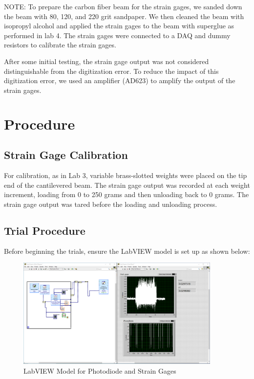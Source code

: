 \documentclass{article}
\begin{document}
\begin{enumerate}
\end{enumerate}

NOTE: To prepare the carbon fiber beam for the strain gages, we sanded down the beam with 80, 120, and 220 grit sandpaper. We then cleaned the beam with isopropyl alcohol and applied the strain gages to the beam with superglue as performed in lab 4. The strain gages were connected to a DAQ and dummy resistors to calibrate the strain gages.
\vspace{1mm}

After some initial testing, the strain gage output was not considered distinguishable from the digitization error. To reduce the impact of this digitization error, we used an amplifier (AD623) to amplify the output of the strain gages.  

\section{Procedure}

\subsection{Strain Gage Calibration}

For calibration, as in Lab 3, variable brass-slotted weights were placed on the tip end of the cantilevered beam. The strain gage output was recorded at each weight increment, loading from 0 to 250 grams and then unloading back to 0 grams. The strain gage output was tared before the loading and unloading process.

\subsection{Trial Procedure}
Before beginning the trials, ensure the LabVIEW model is set up as shown below:

\begin{figure}[H]
  \centering
  \includegraphics[width = 0.9\textwidth]{finalprojectimages/labviewfinalprojectmodel.PNG}
  \caption{LabVIEW Model for Photodiode and Strain Gages}
  \label{fig:labviewsetupfinal}
\end{figure}
\end{document}
